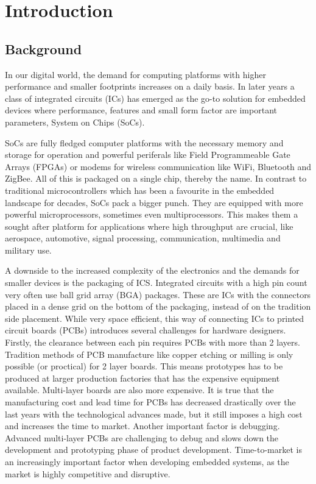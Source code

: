 \section{Introduction}

\subsection{Background}

In our digital world, the demand for computing platforms with higher performance and smaller footprints increases on a daily basis. In later years a class of integrated circuits (ICs) has emerged as the go-to solution for embedded devices where performance, features and small form factor are important parameters, System on Chips (SoCs).

SoCs are fully fledged computer platforms with the necessary memory and storage for operation and powerful periferals like Field Programmeable Gate Arrays (FPGAs) or modems for wireless communication like WiFi, Bluetooth and ZigBee. All of this is packaged on a single chip, thereby the name. In contrast to traditional microcontrollers which has been a favourite in the embedded landscape for decades, SoCs pack a bigger punch. They are equipped with more powerful microprocessors, sometimes even multiprocessors. This makes them a sought after platform for applications where high throughput are crucial, like aerospace, automotive, signal processing, communication, multimedia and military use.

A downside to the increased complexity of the electronics and the demands for smaller devices is the packaging of ICS. Integrated circuits with a high pin count very often use ball grid array (BGA) packages. These are ICs with the connectors placed in a dense grid on the bottom of the packaging, instead of on the tradition side placement. While very space efficient, this way of connecting ICs to printed circuit boards (PCBs) introduces several challenges for hardware designers. Firstly, the clearance between each pin requires PCBs with more than 2 layers. Tradition methods of PCB manufacture like copper etching or milling is only possible (or proctical) for 2 layer boards. This means prototypes has to be produced at larger production factories that has the expensive equipment available. Multi-layer boards are also more expensive. It is true that the manufacturing cost and lead time for PCBs has decreased drastically over the last years with the technological advances made, but it still imposes a high cost and increases the time to market. Another important factor is debugging. Advanced multi-layer PCBs are challenging to debug and slows down the development and prototyping phase of product development. Time-to-market is an increasingly important factor when developing embedded systems, as the market is highly competitive and disruptive. 

